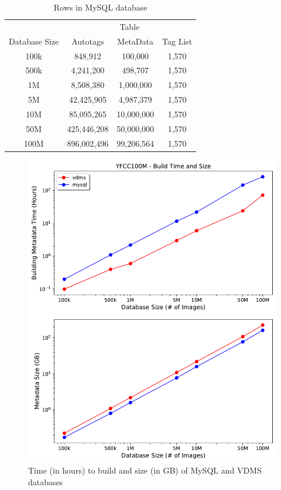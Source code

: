 \begin{table}[h]
\caption{Rows in MySQL database}
\centering
\begin{tabular}{c c c c}
\hline\hline
 & \multicolumn{3}{c}{Table}\\
\cline{2-4}
Database Size & Autotags & MetaData & Tag List\\
\hline
100k & 848,912 & 100,000 & 1,570\\
500k & 4,241,200 & 498,707 & 1,570\\
1M & 8,508,380 & 1,000,000 & 1,570\\
5M & 42,425,905 & 4,987,379 & 1,570\\
10M & 85,095,265 & 10,000,000 & 1,570\\
50M & 425,446,208 & 50,000,000 & 1,570\\
100M & 896,002,496 & 99,206,564 & 1,570\\
\hline
\end{tabular}
\label{table:mysqltables}
\end{table}

\begin{figure}[]
\centering
\includegraphics[width=\columnwidth]{figures/db_time_size}
\caption{Time (in hours) to build and size (in GB) of MySQL and VDMS databases}
\label{fig:db_time_size}
\end{figure}

